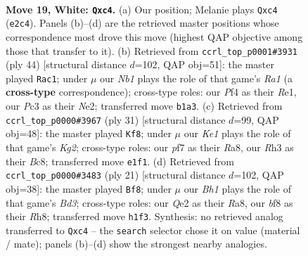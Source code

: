 \documentclass[11pt]{article}
\begin{document}
\clearpage

\begin{figure}[p]\centering
\begin{subfigure}{0.46\textwidth}\centering
\resizebox{\linewidth}{!}{%
\newchessgame
\chessboard[
  setfen={2rk1bnr/1b3pp1/pq1P4/2p3Pp/2p2P1P/2P4R/PP2Q3/RNB1K2B w Q - 2 19},
  showmover=false,
  pgfstyle=straightmove, color=movearrow, markmove={e2-c4}
]}
\caption{}
\end{subfigure}\hfill
\begin{subfigure}{0.46\textwidth}\centering
\resizebox{\linewidth}{!}{%
\newchessgame
\chessboard[
  setfen={1r3rk1/2pqb1p1/2p4p/p2pPb2/Q2Pp3/P3B2P/1P2NPP1/R3R1K1 w - - 4 23},
  showmover=false,
  pgfstyle=straightmove, color=movearrow, markmove={a1-c1}
]}
\caption{}
\end{subfigure}
\\[4pt]
\begin{subfigure}{0.46\textwidth}\centering
\resizebox{\linewidth}{!}{%
\newchessgame
\chessboard[
  setfen={r1b1n2r/1p3pkp/p1n1p3/2qpPP1Q/8/2NB4/PPP3PP/R4R1K b - - 0 16},
  showmover=false,
  pgfstyle=straightmove, color=movearrow, markmove={g7-f8}
]}
\caption{}
\end{subfigure}\hfill
\begin{subfigure}{0.46\textwidth}\centering
\resizebox{\linewidth}{!}{%
\newchessgame
\chessboard[
  setfen={r1b1k2r/pp1n1ppp/1q1bp3/3p4/3P1BQ1/3BP3/PP1N1PPP/R3K2R b KQkq - 3 11},
  showmover=false,
  pgfstyle=straightmove, color=movearrow, markmove={d6-f8}
]}
\caption{}
\end{subfigure}
\caption{\textbf{Move 19, White: \texttt{Qxc4}.} (a) Our position; Melanie plays \texttt{Qxc4} (\texttt{e2c4}). Panels (b)--(d) are the retrieved master positions whose correspondence most drove this move (highest QAP objective among those that transfer to it). (b) Retrieved from \texttt{ccrl\_top\_p0001\#3931} (ply 44) [structural distance $d$=102, QAP obj=51]: the master played \texttt{Rac1}; under $\mu$ our \emph{Nb1} plays the role of that game's \emph{Ra1} (a \textbf{cross-type} correspondence); cross-type roles: our \emph{P}f4 as their \emph{R}e1, our \emph{P}c3 as their \emph{N}e2; transferred move \texttt{b1a3}. (c) Retrieved from \texttt{ccrl\_top\_p0000\#3967} (ply 31) [structural distance $d$=99, QAP obj=48]: the master played \texttt{Kf8}; under $\mu$ our \emph{Ke1} plays the role of that game's \emph{Kg2}; cross-type roles: our \emph{p}f7 as their \emph{R}a8, our \emph{R}h3 as their \emph{B}c8; transferred move \texttt{e1f1}. (d) Retrieved from \texttt{ccrl\_top\_p0000\#3483} (ply 21) [structural distance $d$=102, QAP obj=38]: the master played \texttt{Bf8}; under $\mu$ our \emph{Bh1} plays the role of that game's \emph{Bd3}; cross-type roles: our \emph{Q}e2 as their \emph{R}a8, our \emph{b}f8 as their \emph{R}h8; transferred move \texttt{h1f3}. Synthesis: no retrieved analog transferred to \texttt{Qxc4} -- the \texttt{search} selector chose it on value (material / mate); panels (b)--(d) show the strongest nearby analogies.}
\label{fig:thought-m36}
\end{figure}
\end{document}
